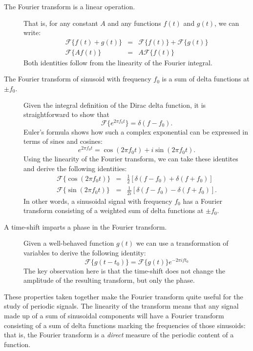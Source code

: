\documentclass[preprint]{aastex}
\newcommand{\eqlabel}[1]{\label{eq:#1}}
\begin{document}
\begin{description}
   \item[The Fourier transform is a linear operation.]
     That is, for any constant $A$ and any functions $f(t)$ and $g(t)$,
     we can write:
     \begin{eqnarray}
       \mathcal{F}\{f(t) + g(t)\} &=& \mathcal{F}\{f(t)\} + \mathcal{F}\{g(t)\}\nonumber\\
       \mathcal{F}\{A f(t)\} &=& A\mathcal{F}\{f(t)\}
     \end{eqnarray}
     Both identities follow from the linearity of the Fourier integral.

   \item[The Fourier transform of sinusoid with frequency $f_0$ is a sum of delta functions at $\pm f_0$.]
     Given the integral definition of the Dirac delta function, it is straightforward to show that
     \begin{equation}
       \mathcal{F}\{e^{2\pi f_0 t}\} = \delta(f - f_0).
       \eqlabel{delta-FT}
     \end{equation}
     Euler's formula shows how such a complex exponential
     can be expressed in terms of sines and cosines:
     \begin{equation}
       e^{2\pi f_0 t} = \cos(2\pi f_0 t) + i\sin(2\pi f_0 t).
       \eqlabel{Euler-formula}
     \end{equation}
     Using the linearity of the Fourier transform, we can take these identites
     and derive the following identities:
     \begin{eqnarray}
       \mathcal{F}\{\cos(2\pi f_0 t)\} &=& \frac{1}{2}\left[\delta(f - f_0) + \delta(f + f_0)\right]\nonumber\\
       \mathcal{F}\{\sin(2\pi f_0 t)\} &=& \frac{1}{2i}\left[\delta(f - f_0) - \delta(f + f_0)\right].
     \end{eqnarray}
     In other words, a sinusoidal signal with frequency $f_0$ has a Fourier
     transform consisting of a weighted sum of delta functions at $\pm f_0$.

   \item[A time-shift imparts a phase in the Fourier transform.]
     Given a well-behaved function $g(t)$ we can use a transformation of
     variables to derive the following identity:
     \begin{equation}
       \mathcal{F}\{g(t - t_0)\} = \mathcal{F}\{g(t)\} e^{-2\pi i ft_0}
     \end{equation}
     The key observation here is that the time-shift does not change the
     amplitude of the resulting transform, but only the phase.
\end{description}
These properties taken together make the Fourier transform quite useful for the study of periodic signals.
The linearity of the transform means that any signal made up of a sum of
sinusoidal components will have a Fourier transform consisting of a sum
of delta functions marking the frequencies of those sinusoids: that is,
the Fourier transform is a {\it direct} measure of the periodic
content of a function.
\end{document}
